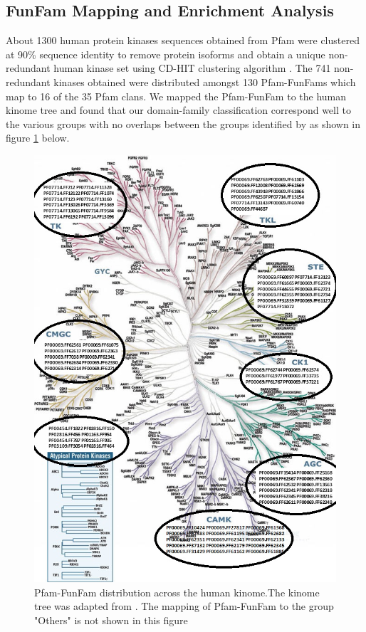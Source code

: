 \documentclass[a4paper, 11pt]{report}
\newcommand{\redcomment}[1]{\textcolor{red}{[#1]}} %
\begin{document}
\subsection{FunFam Mapping and Enrichment Analysis}
About 1300 human protein kinases sequences obtained from Pfam were clustered at 90\% sequence identity to remove protein isoforms and obtain a unique non-redundant human kinase set using CD-HIT clustering algorithm \cite{li2006cd}. The 741 non-redundant kinases obtained were distributed amongst 130 Pfam-FunFams which map to 16 of the 35 Pfam clans. We mapped the Pfam-FunFam to the human kinome tree and found that our domain-family classification correspond well to the various groups with no overlaps between the groups identified by \cite{manning2002protein} as shown in figure \ref{kinasetree} below. %
\begin{figure}[H]
	\includegraphics[width=.8\linewidth]{figures/kinometree.jpg}
	\centering
	\caption{Pfam-FunFam distribution across the human kinome.The kinome tree was adapted from \cite{manning2002protein}. The mapping of Pfam-FunFam to the group "Others" is not shown in this figure}
	\label{kinasetree}
\end{figure}
\end{document}
